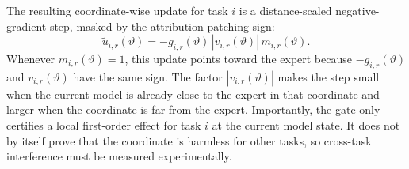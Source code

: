 \documentclass[11pt]{article}
\newcommand{\loss}{\mathcal{L}}
\newcommand{\data}{\mathcal{D}}
\begin{document}
The resulting coordinate-wise update for task $i$ is a distance-scaled negative-gradient step, masked by the attribution-patching sign:
\begin{equation}
    \widetilde u_{i,r}(\vartheta)
    =
    -g_{i,r}(\vartheta)\,\left|v_{i,r}(\vartheta)\right|\,m_{i,r}(\vartheta).
    \label{eq:raw-update}
\end{equation}
Whenever $m_{i,r}(\vartheta)=1$, this update points toward the expert because $-g_{i,r}(\vartheta)$ and $v_{i,r}(\vartheta)$ have the same sign. The factor $|v_{i,r}(\vartheta)|$ makes the step small when the current model is already close to the expert in that coordinate and larger when the coordinate is far from the expert. Importantly, the gate only certifies a local first-order effect for task $i$ at the current model state. It does not by itself prove that the coordinate is harmless for other tasks, so cross-task interference must be measured experimentally.

\end{document}
